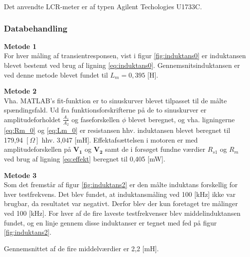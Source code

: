 Det anvendte LCR-meter er af typen Agilent Techologies U1733C.

\subsubsection{Databehandling}
\textbf{Metode 1}\\
For hver måling af transientresponsen, vist i figur \ref{fig:induktans0} er induktansen blevet
bestemt ved brug af ligning \ref{eq:induktans0}.
Gennemsnitsinduktansen er ved denne metode blevet fundet til \(L_m=0,395\) [H].

\textbf{Metode 2}\\
Vha. MATLAB's fit-funktion er to sinuskurver blevet tilpasset til de målte spændingsfald.
Ud fra funktionsforskrifterne på de to sinuskurver er amplitudeforholdet \(\frac{A_1}{A_2}\)
og faseforskellen \(\phi\) blevet beregnet,
og vha. ligningerne \ref{eq:Rm_0} og \ref{eq:Lm_0} er resistansen hhv. induktansen blevet beregnet til
179,94 \([\Omega]\) hhv. 3,047 [mH].
Effektafsættelsen i motoren er med amplitudeforskellen på \(\mathbf{V_1}\) og \(\mathbf{V_2}\) samt
de i forsøget fundne værdier \(R_{s1}\) og \(R_m\) ved brug af ligning \ref{eq:effekt} beregnet til 0,405 [mW].

\textbf{Metode 3}\\
Som det fremstår af figur \ref{fig:induktans2} er den målte induktans forskellig for hver testfrekvens.
Det blev fundet, at induktansmåling ved 100 [kHz] ikke var brugbar, da resultatet var negativt.
Derfor blev der kun foretaget tre målinger ved 100 [kHz].
For hver af de fire laveste testfrekvenser blev middelinduktansen fundet, og
en linje gennem disse induktanser er tegnet med fed på figur \ref{fig:induktans2}.

Gennemsnittet af de fire middelværdier er 2,2 [mH].

